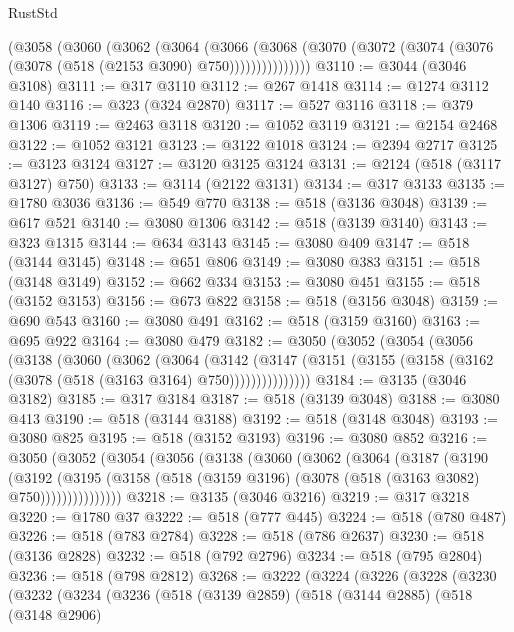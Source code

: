 \begin{lexlean}{RustStd}
\begin{coremodule}
          (@3058
            (@3060
              (@3062
                (@3064
                  (@3066
                    (@3068
                      (@3070 (@3072 (@3074 (@3076 (@3078 (@518 (@2153 @3090) @750)))))))))))))))
@3110 := @3044 (@3046 @3108)
@3111 := @317 @3110
@3112 := @267 @1418
@3114 := @1274 @3112 @140
@3116 := @323 (@324 @2870)
@3117 := @527 @3116
@3118 := @379 @1306
@3119 := @2463 @3118
@3120 := @1052 @3119
@3121 := @2154 @2468
@3122 := @1052 @3121
@3123 := @3122 @1018
@3124 := @2394 @2717
@3125 := @3123 @3124
@3127 := @3120 @3125 @3124
@3131 := @2124 (@518 (@3117 @3127) @750)
@3133 := @3114 (@2122 @3131)
@3134 := @317 @3133
@3135 := @1780 @3036
@3136 := @549 @770
@3138 := @518 (@3136 @3048)
@3139 := @617 @521
@3140 := @3080 @1306
@3142 := @518 (@3139 @3140)
@3143 := @323 @1315
@3144 := @634 @3143
@3145 := @3080 @409
@3147 := @518 (@3144 @3145)
@3148 := @651 @806
@3149 := @3080 @383
@3151 := @518 (@3148 @3149)
@3152 := @662 @334
@3153 := @3080 @451
@3155 := @518 (@3152 @3153)
@3156 := @673 @822
@3158 := @518 (@3156 @3048)
@3159 := @690 @543
@3160 := @3080 @491
@3162 := @518 (@3159 @3160)
@3163 := @695 @922
@3164 := @3080 @479
@3182 := @3050
    (@3052
      (@3054
        (@3056
          (@3138
            (@3060
              (@3062
                (@3064
                  (@3142
                    (@3147
                      (@3151 (@3155 (@3158 (@3162 (@3078 (@518 (@3163 @3164) @750)))))))))))))))
@3184 := @3135 (@3046 @3182)
@3185 := @317 @3184
@3187 := @518 (@3139 @3048)
@3188 := @3080 @413
@3190 := @518 (@3144 @3188)
@3192 := @518 (@3148 @3048)
@3193 := @3080 @825
@3195 := @518 (@3152 @3193)
@3196 := @3080 @852
@3216 := @3050
    (@3052
      (@3054
        (@3056
          (@3138
            (@3060
              (@3062
                (@3064
                  (@3187
                    (@3190
                      (@3192
                        (@3195
                          (@3158 (@518 (@3159 @3196) (@3078 (@518 (@3163 @3082) @750)))))))))))))))
@3218 := @3135 (@3046 @3216)
@3219 := @317 @3218
@3220 := @1780 @37
@3222 := @518 (@777 @445)
@3224 := @518 (@780 @487)
@3226 := @518 (@783 @2784)
@3228 := @518 (@786 @2637)
@3230 := @518 (@3136 @2828)
@3232 := @518 (@792 @2796)
@3234 := @518 (@795 @2804)
@3236 := @518 (@798 @2812)
@3268 := @3222
    (@3224
      (@3226
        (@3228
          (@3230
            (@3232
              (@3234
                (@3236
                  (@518
                    (@3139 @2859)
                    (@518
                      (@3144 @2885)
                      (@518
                        (@3148 @2906)

\end{coremodule}
\end{lexlean}
